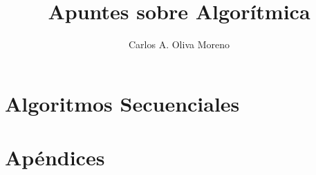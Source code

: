 \documentclass[letterpaper]{book}
\theoremstyle{definition}
\theoremstyle{plain}
\theoremstyle{remark}
\begin{document}
    \setlength{\oddsidemargin}{0pt}
    \setlength{\marginparwidth}{160pt}
    \setlength{\topmargin}{0pt}
    \setlength{\textheight}{595pt}
    \setlength{\evensidemargin}{124pt}

    \title{\textbf{Apuntes sobre Algorítmica}}
    \author{Carlos A. Oliva Moreno}
    \maketitle
    
    \tableofcontents{}
    
    \part{Algoritmos Secuenciales}
        
        
        
        
        
    
    \part{Apéndices}
    \appendix
        
        
    
    \printbibliography[heading=bibintoc]
\end{document}
